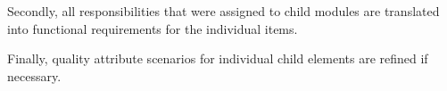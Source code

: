
\npar Secondly, all responsibilities that were assigned to child modules are
translated into functional requirements for the individual items. 


\npar Finally, quality attribute scenarios for individual child elements are
refined if necessary.



